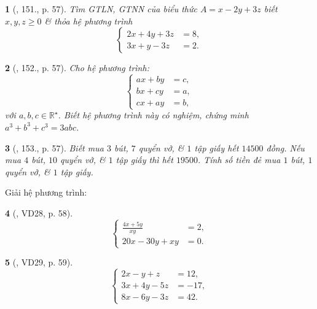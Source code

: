 \documentclass{article}
\newtheorem{baitoan}{}
\begin{document}
\begin{baitoan}[\cite{Tuyen_Toan_9_old}, 151., p. 57]
	Tìm {\rm GTLN, GTNN} của biểu thức $A = x - 2y + 3z$ biết $x,y,z\ge0$ \& thỏa hệ phương trình
	\begin{equation*}
		\left\{\begin{split}
			2x + 4y + 3z &= 8,\\
			3x + y - 3z &= 2.
		\end{split}\right.
	\end{equation*}
\end{baitoan}

\begin{baitoan}[\cite{Tuyen_Toan_9_old}, 152., p. 57]
	Cho hệ phương trình:
	\begin{equation*}
		\left\{\begin{split}
			ax + by &= c,\\
			bx + cy &= a,\\
			cx + ay &= b,
		\end{split}\right.
	\end{equation*}
	với $a,b,c\in\mathbb{R}^\star$. Biết hệ phương trình này có nghiệm, chứng minh $a^3 + b^3 + c^3 = 3abc$.
\end{baitoan}

\begin{baitoan}[\cite{Tuyen_Toan_9_old}, 153., p. 57]
	Biết mua $3$ bút, $7$ quyển vở, \& $1$ tập giấy hết $14500$ đồng. Nếu mua $4$ bút, $10$ quyển vở, \& $1$ tập giấy thì hết $19500$. Tính số tiền đẻ mua $1$ bút, $1$ quyển vở, \& $1$ tập giấy.
\end{baitoan}
Giải hệ phương trình:

\begin{baitoan}[\cite{Tuyen_Toan_9_old}, VD28, p. 58]
	\begin{equation*}
		\left\{\begin{split}
			\frac{4x + 5y}{xy} &= 2,\\
			20x - 30y + xy &= 0.
		\end{split}\right.
	\end{equation*}
\end{baitoan}

\begin{baitoan}[\cite{Tuyen_Toan_9_old}, VD29, p. 59]
	\begin{equation*}
		\left\{\begin{split}
			2x - y + z &= 12,\\
			3x + 4y - 5z &= -17,\\
			8x - 6y - 3z &= 42.
		\end{split}\right.
	\end{equation*}
\end{baitoan}
\end{document}
